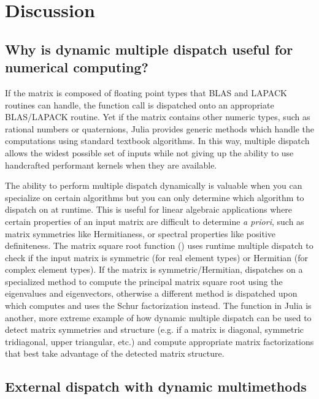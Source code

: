\section{Discussion}

\subsection{Why is dynamic multiple dispatch useful for numerical computing?}

If the matrix is composed of floating point types that BLAS and
LAPACK routines can handle, the function call is dispatched onto an
appropriate BLAS/LAPACK routine. Yet if the matrix contains other
numeric types, such as rational numbers or quaternions, Julia provides
generic methods which handle the computations using standard textbook
algorithms. In this way, multiple dispatch allows the widest possible
set of inputs while not giving up the ability to use handcrafted
performant kernels when they are available.

The ability to perform multiple dispatch dynamically is valuable
when you can specialize on certain algorithms but you can only
determine which algorithm to dispatch on at runtime. This is useful
for linear algebraic applications where certain properties of an input
matrix are difficult to determine \textit{a priori}, such as matrix
symmetries like Hermitianess, or spectral properties like positive
definiteness. The matrix square root function () uses
runtime multiple dispatch to check if the input matrix is symmetric
(for real element types) or Hermitian (for complex element types). If
the matrix is symmetric/Hermitian,  dispatches on a
specialized method to compute the principal matrix square root using
the eigenvalues and eigenvectors, otherwise a different method is
dispatched upon which computes and uses the Schur factorization
instead. The  function in Julia is another, more
extreme example of how dynamic multiple dispatch can be used to detect
matrix symmetries and structure (e.g. if a matrix is diagonal,
symmetric tridiagonal, upper triangular, etc.) and compute appropriate
matrix factorizations that best take advantage of the detected matrix
structure.


\subsection{External dispatch with dynamic multimethods}

